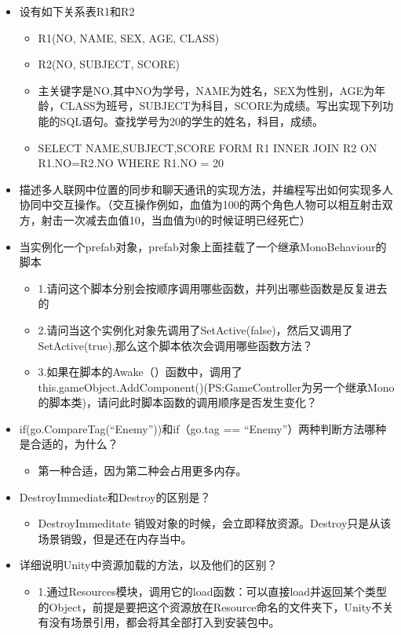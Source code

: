 \documentclass[9pt, b5paper]{article}
\begin{document}
\begin{itemize}
\begin{itemize}
\end{itemize}
\item 设有如下关系表R1和R2
\begin{itemize}
\item R1(NO, NAME, SEX, AGE, CLASS)
\item R2(NO, SUBJECT, SCORE)
\item 主关键字是NO,其中NO为学号，NAME为姓名，SEX为性别，AGE为年龄，CLASS为班号，SUBJECT为科目，SCORE为成绩。写出实现下列功能的SQL语句。查找学号为20的学生的姓名，科目，成绩。
\item SELECT NAME,SUBJECT,SCORE FORM R1 INNER JOIN R2 ON R1.NO=R2.NO WHERE R1.NO = 20
\end{itemize}
\item 描述多人联网中位置的同步和聊天通讯的实现方法，并编程写出如何实现多人协同中交互操作。（交互操作例如，血值为100的两个角色人物可以相互射击双方，射击一次减去血值10，当血值为0的时候证明已经死亡）
\item 当实例化一个prefab对象，prefab对象上面挂载了一个继承MonoBehaviour的脚本
\begin{itemize}
\item 1.请问这个脚本分别会按顺序调用哪些函数，并列出哪些函数是反复进去的
\item 2.请问当这个实例化对象先调用了SetActive(false)，然后又调用了SetActive(true),那么这个脚本依次会调用哪些函数方法？
\item 3.如果在脚本的Awake（）函数中，调用了this.gameObject.AddComponent()(PS:GameController为另一个继承Mono的脚本类)，请问此时脚本函数的调用顺序是否发生变化？
\end{itemize}
\item if(go.CompareTag(“Enemy”))和if（go.tag == “Enemy”）两种判断方法哪种是合适的，为什么？
\begin{itemize}
\item 第一种合适，因为第二种会占用更多内存。
\end{itemize}
\item DestroyImmediate和Destroy的区别是？
\begin{itemize}
\item DestroyImmeditate 销毁对象的时候，会立即释放资源。Destroy只是从该场景销毁，但是还在内存当中。
\end{itemize}
\item 详细说明Unity中资源加载的方法，以及他们的区别？
\begin{itemize}
\item 1.通过Resources模块，调用它的load函数：可以直接load并返回某个类型的Object，前提是要把这个资源放在Resource命名的文件夹下，Unity不关有没有场景引用，都会将其全部打入到安装包中。

\end{itemize}
\end{itemize}
\end{document}
